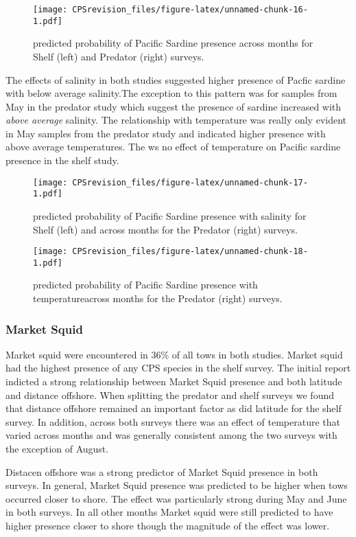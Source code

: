 \documentclass[
]{article}
\begin{document}
\begin{figure}
\centering
\texttt{[image: CPSrevision\_files/figure-latex/unnamed-chunk-16-1.pdf]}
\caption{predicted probability of Pacific Sardine presence across months
for Shelf (left) and Predator (right) surveys.}
\end{figure}

The effects of salinity in both studies suggested higher presence of
Pacfic sardine with below average salinity.The exception to this pattern
was for samples from May in the predator study which suggest the
presence of sardine increased with \emph{above average} salinity. The
relationship with temperature was really only evident in May samples
from the predator study and indicated higher presence with above average
temperatures. The ws no effect of temperature on Pacific sardine
presence in the shelf study.

\begin{figure}
\centering
\texttt{[image: CPSrevision\_files/figure-latex/unnamed-chunk-17-1.pdf]}
\caption{predicted probability of Pacific Sardine presence with salinity
for Shelf (left) and across months for the Predator (right) surveys.}
\end{figure}

\begin{figure}
\centering
\texttt{[image: CPSrevision\_files/figure-latex/unnamed-chunk-18-1.pdf]}
\caption{predicted probability of Pacific Sardine presence with
temperatureacross months for the Predator (right) surveys.}
\end{figure}

\hypertarget{market-squid-1}{%
\subsubsection{Market Squid}\label{market-squid-1}}

Market squid were encountered in 36\% of all tows in both studies.
Market squid had the highest presence of any CPS species in the shelf
survey. The initial report indicted a strong relationship between Market
Squid presence and both latitude and distance offshore. When splitting
the predator and shelf surveys we found that distance offshore remained
an important factor as did latitude for the shelf survey. In addition,
across both surveys there was an effect of temperature that varied
across months and was generally consistent among the two surveys with
the exception of August.

Distacen offshore was a strong predictor of Market Squid presence in
both surveys. In general, Market Squid presence was predicted to be
higher when tows occurred closer to shore. The effect was particularly
strong during May and June in both surveys. In all other months Market
squid were still predicted to have higher presence closer to shore
though the magnitude of the effect was lower.
\end{document}
